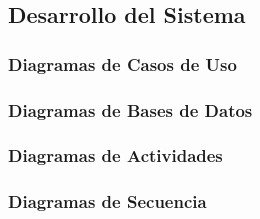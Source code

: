 \subsection{Desarrollo del Sistema}
\label{sec:desarrollo_sistema}

\subsubsection{Diagramas de Casos de Uso}
\label{sec:diagramas_casos_uso}

\subsubsection{Diagramas de Bases de Datos}
\label{sec:diagramas_bases_datos}

\subsubsection{Diagramas de Actividades}
\label{sec:diagramas_actividades}

\subsubsection{Diagramas de Secuencia}
\label{sec:diagramas_secuencia}
